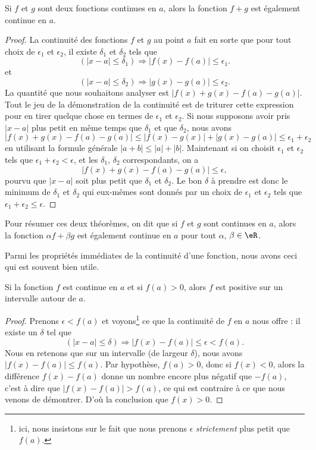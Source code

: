 \begin{theorem}
Si $f$ et $g$ sont deux fonctions continues en $a$, alors la fonction $f+g$ est également continue en $a$.
\end{theorem}

\begin{proof}
La continuité des fonctions $f$ et $g$ au point $a$ fait en sorte que pour tout choix de $\epsilon_1$ et $\epsilon_2$, il existe $\delta_1$ et $\delta_2$ tels que
\[
  (| x-a |\leq \delta_1)\Rightarrow | f(x)-f(a) |\leq \epsilon_1.
\]
et
\[
  (| x-a |\leq \delta_2)\Rightarrow | g(x)-g(a) |\leq \epsilon_2.
\]
La quantité que nous souhaitons analyser est $| f(x)+g(x)-f(a)-g(a) |$. Tout le jeu de la démonstration de la continuité est de triturer cette expression pour en tirer quelque chose en termes de $\epsilon_1$ et $\epsilon_2$. Si nous supposons avoir pris $| x-a |$ plus petit en même temps que $\delta_1$ et que $\delta_2$, nous avons
\[
| f(x)+g(x)-f(a)-g(a) |\leq| f(x)-g(x) |+| g(x)-g(a) |\leq\epsilon_1+\epsilon_2
\]
en utilisant la formule générale $| a+b |\leq | a |+| b |$. Maintenant si on choisit $\epsilon_1$ et $\epsilon_2$ tels que $\epsilon_1+\epsilon_2<\epsilon$, et les $\delta_1$, $\delta_2$ correspondants, on a
\[
| f(x)+g(x)-f(a)-g(a) |\leq\epsilon,
\]
pourvu que $| x-a |$ soit plus petit que $\delta_1$ et $\delta_2$. Le bon $\delta$ à prendre est donc le minimum de $\delta_1$ et $\delta_2$ qui eux-mêmes sont donnés par un choix de $\epsilon_1$ et $\epsilon_2$ tels que $\epsilon_1+\epsilon_2\leq\epsilon$.
\end{proof}

Pour résumer ces deux théorèmes, on dit que si $f$ et $g$ sont continues en $a$, alors la fonction $\alpha f+\beta g$ est également continue en $a$ pour tout $\alpha$, $\beta\in\eR$.

Parmi les propriétés immédiates de la continuité d'une fonction, nous avons ceci qui est souvent bien utile.

\begin{corollary}   \label{CorNNPYooMbaYZg}
Si la fonction $f$ est continue en $a$ et si $f(a)>0$, alors $f$ est positive sur un intervalle autour de $a$.
\end{corollary}

\begin{proof}
Prenons $\epsilon<f(a)$ et voyons\footnote{ici, nous insistons sur le fait que nous prenons $\epsilon$ \emph{strictement} plus petit que $f(a)$.} ce que la continuité de $f$ en $a$ nous offre : il existe un $\delta$ tel que
\[
  (| x-a |\leq \delta)\Rightarrow | f(x)-f(a) |\leq\epsilon < f(a).
\]
Nous en retenons que sur un intervalle (de largeur $\delta$), nous avons $| f(x)-f(a) |\leq f(a)$. Par hypothèse, $f(a)>0$, donc si $f(x)<0$, alors la différence $f(x)-f(a)$ donne un nombre encore plus négatif que $-f(a)$, c'est à dire que $| f(x)-f(a) |>f(a)$, ce qui est contraire à ce que nous venons de démontrer. D'où la conclusion que $f(x)>0$.
\end{proof}


